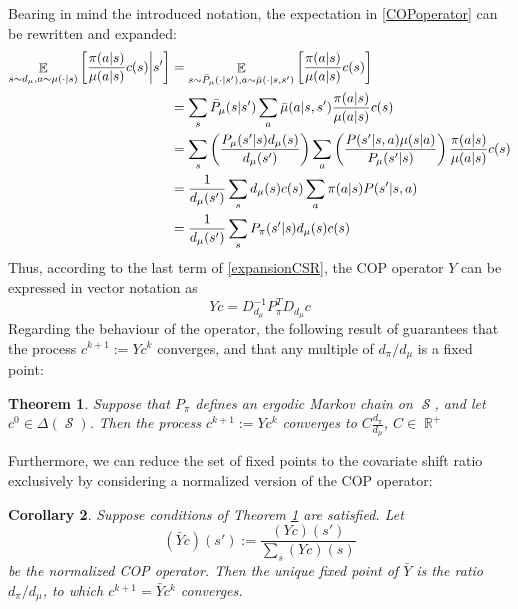 \documentclass[12pt,a4paper,openright,twoside]{article}
\DeclareMathOperator*{\E}{\mathbb{E}}
\DeclareMathOperator*{\R}{\mathbb{R}}
\DeclareMathOperator*{\Sspace}{\mathcal{S}}
\numberwithin{equation}{section}
\newtheorem{theorem}{Theorem}[section]
\newtheorem{corol}[theorem]{Corollary}
\theoremstyle{definition}
\theoremstyle{remark}
\theoremstyle{plain}
\begin{document}
Bearing in mind the introduced notation, the expectation in \ref{COPoperator} can be rewritten and expanded:
\begin{equation} \label{expansionCSR}
\begin{split}
    \E_{s \sim d_\mu, a \sim \mu(\cdot|s)} \left[ \frac{\pi(a|s)}{\mu(a|s)}c(s)  \bigg| s' \right] &= \E_{s \sim \Bar{P}_\mu (\cdot | s'), a \sim \Bar{\mu}(\cdot|s,s')} \left[ \frac{\pi(a|s)}{\mu(a|s)}c(s) \right] \\
    &= \sum_s \Bar{P}_\mu (s | s') \sum_a \Bar{\mu}(a|s,s') \frac{\pi(a|s)}{\mu(a|s)} c(s) \\
    &= \sum_s \left( \frac{P_\mu (s' | s) d_\mu(s)}{d_\mu(s')}  \right) \sum_a  \left( \frac{P(s'|s,a)\mu(s|a)}{P_\mu (s'|s)} \right) \frac{\pi(a|s)}{\mu(a|s)} c(s) \\
    &= \frac{1}{d_\mu(s')} \sum_{s} d_\mu(s) c(s) \sum_a \pi(a|s) P(s'|s,a) \\
    &= \frac{1}{d_\mu(s')} \sum_{s} P_\pi(s'|s) d_\mu(s) c(s) \\
\end{split}
\end{equation}
Thus, according to the last term of \ref{expansionCSR}, the COP operator $Y$ can be expressed in vector notation as
\begin{equation}
    Yc = D_{d_\mu}^{-1}P_\pi^T D_{d_\mu} c
\end{equation}
Regarding the behaviour of the operator, the following result of \cite{DCOPTD} guarantees that the process $c^{k+1} := Yc^k$ converges, and that any multiple of $d_\pi / d_\mu$ is a fixed point:
\begin{theorem} \label{convergenceCOPTD}
	Suppose that $P_\pi$ defines an ergodic Markov chain on $\Sspace$, and let $c^0 \in \Delta(\Sspace)$. Then the process $c^{k+1} := Yc^k$ converges to $C \frac{d_\pi}{d_\mu}$, $C \in \R^+$
\end{theorem}

Furthermore, we can reduce the set of fixed points to the covariate shift ratio exclusively by considering a normalized version of the COP operator:
\begin{corol}
	Suppose conditions of Theorem \ref{convergenceCOPTD} are satisfied. Let
	\begin{equation*}
		(\bar{Y} c)(s') := \frac{(Yc)(s')}{\sum_{s} (Yc)(s)}
	\end{equation*}
	be the normalized COP operator. Then the unique fixed point of $\bar{Y}$ is the ratio $d_{\pi}/d_\mu$, to which $c^{k+1} = \bar{Y} c^k$ converges.
\end{corol}
\end{document}
